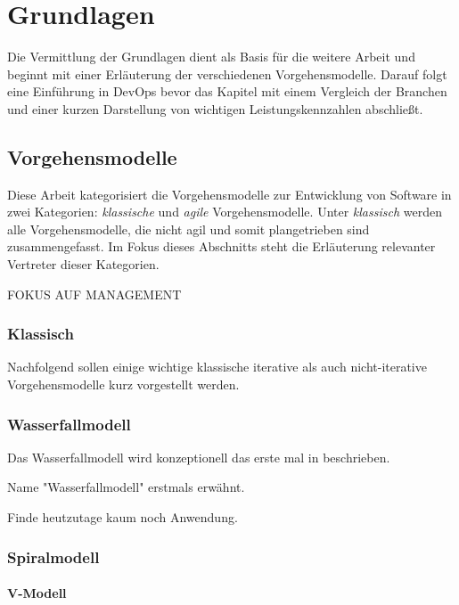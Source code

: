 \chapter{Grundlagen} %

Die Vermittlung der Grundlagen dient als Basis für die weitere Arbeit und beginnt mit  einer Erläuterung der verschiedenen Vorgehensmodelle.
Darauf folgt eine Einführung in DevOps bevor das Kapitel mit einem Vergleich der Branchen und einer kurzen Darstellung von wichtigen Leistungskennzahlen abschließt.

\section{Vorgehensmodelle} %

Diese Arbeit kategorisiert die Vorgehensmodelle zur Entwicklung von Software in zwei Kategorien: \emph{klassische} und \emph{agile} Vorgehensmodelle.
Unter \emph{klassisch} werden alle Vorgehensmodelle, die nicht agil und somit plangetrieben sind zusammengefasst.
Im Fokus dieses Abschnitts steht die Erläuterung relevanter Vertreter dieser Kategorien.

FOKUS AUF MANAGEMENT

\subsection{Klassisch} %

Nachfolgend sollen einige wichtige klassische iterative als auch nicht-iterative Vorgehensmodelle kurz vorgestellt werden.

\subsection{Wasserfallmodell}

Das Wasserfallmodell wird konzeptionell das erste mal in \parencite[][]{Royce:1987aa} beschrieben.

Name "Wasserfallmodell" erstmals erwähnt. \parencite[Vgl.][S. XY]{Benington:1983aa}

Finde heutzutage kaum noch Anwendung.  \parencite[Vgl.][S. 48]{Schatten:2010aa}

\subsection{Spiralmodell}

\subsubsection{V-Modell}

